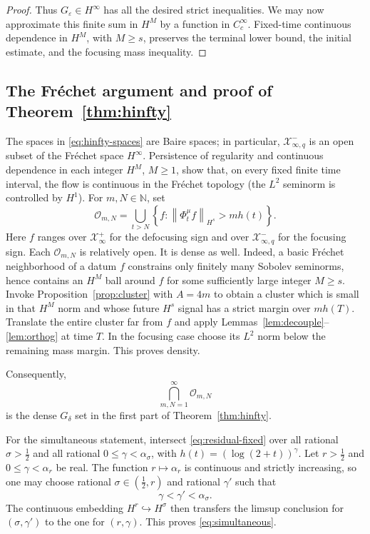 \documentclass[11pt,reqno]{amsart}
\numberwithin{equation}{section}
\theoremstyle{remark}
\newcommand{\N}{\mathbb N}
\newcommand{\X}{\mathcal X}
\newcommand{\eps}{\varepsilon}
\newcommand{\half}{\frac12}
\newcommand{\norm}[1]{\left\lVert #1\right\rVert}
\newcommand{\flow}[1]{\Phi^{#1}}
\begin{document}
\begin{proof}
Thus $G_\eps\in H^\infty$ has all the desired strict inequalities.  We may
now approximate this finite sum in $H^M$ by a function in $C_c^\infty$.
Fixed-time continuous dependence in $H^M$, with $M\geq s$, preserves the
terminal lower bound, the initial estimate, and the focusing mass inequality.
\end{proof}

\subsection{The Fr\'echet argument and proof of Theorem~\ref{thm:hinfty}}

The spaces in \eqref{eq:hinfty-spaces} are Baire spaces; in particular,
$\X^-_{\infty,q}$ is an open subset of the Fr\'echet space $H^\infty$.
Persistence of regularity and continuous dependence in each integer $H^M$,
$M\geq1$, show that, on every fixed finite time interval, the flow is
continuous in the Fr\'echet topology (the $L^2$ seminorm is controlled by
$H^1$).  For $m,N\in\N$, set
\begin{equation}\label{eq:open-events}
 \mathcal O_{m,N}=
 \bigcup_{t>N}\left\{f:
 \norm{\flow\mu_tf}_{H^s}>m h(t)\right\}.
\end{equation}
Here $f$ ranges over $\X^+_\infty$ for the defocusing sign and over
$\X^-_{\infty,q}$ for the focusing sign.
Each $\mathcal O_{m,N}$ is relatively open.  It is dense as well.  Indeed, a
basic Fr\'echet neighborhood of a datum $f$ constrains only finitely many
Sobolev seminorms, hence contains an $H^M$ ball around $f$ for some sufficiently
large integer $M\geq s$.  Invoke Proposition~\ref{prop:cluster} with
$A=4m$ to obtain a cluster which is small in that $H^M$ norm and whose
future $H^s$ signal has a strict margin over $m h(T)$.  Translate the entire
cluster far from $f$ and apply
Lemmas~\ref{lem:decouple}--\ref{lem:orthog} at time $T$.  In the focusing
case choose its $L^2$ norm below the remaining mass margin.  This proves
density.

Consequently,
\begin{equation}\label{eq:residual-fixed}
 \bigcap_{m,N=1}^\infty\mathcal O_{m,N}
\end{equation}
is the dense $G_\delta$ set in the first part of
Theorem~\ref{thm:hinfty}.

For the simultaneous statement, intersect \eqref{eq:residual-fixed} over all
rational $\sigma>\half$ and all rational
$0\leq\gamma<\alpha_\sigma$, with
$h(t)=(\log(2+t))^\gamma$.  Let $r>\half$ and
$0\leq\gamma<\alpha_r$ be real.  The function $r\mapsto\alpha_r$ is
continuous and strictly increasing, so one may choose rational
$\sigma\in(\half,r)$ and rational $\gamma'$ such that
\[
 \gamma<\gamma'<\alpha_\sigma.
\]
The continuous embedding $H^r\hookrightarrow H^\sigma$ then transfers the
limsup conclusion for $(\sigma,\gamma')$ to the one for $(r,\gamma)$.
This proves \eqref{eq:simultaneous}.
\end{document}
